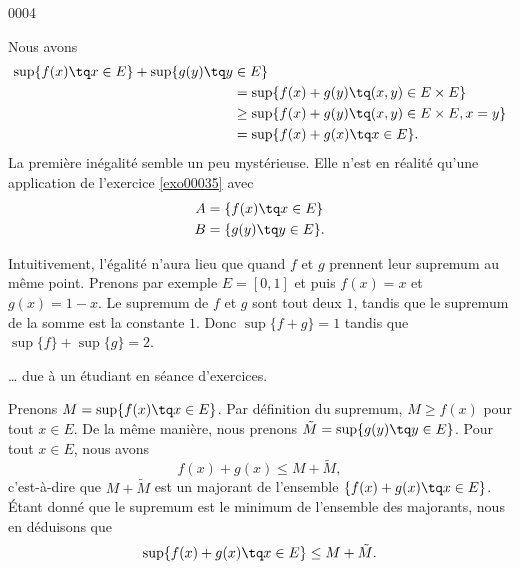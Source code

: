 
\begin{corrige}{0004}

Nous avons
\begin{equation}
	\begin{aligned}[]
		\sup\{ f(x)\tq x\in E \}+\sup\{ g(y)\tq y&\in E \}\\
							&=\sup\{ f(x)+g(y)\tq (x,y)\in E\times E \}\\
									&\geq\sup\{  f(x)+g(y)\tq (x,y)\in E\times E, x=y \} \\
							&=\sup\{ f(x)+g(x)\tq x\in E \}.
	\end{aligned}
\end{equation}
La première inégalité semble un peu mystérieuse. Elle n'est en réalité qu'une application de l'exercice \ref{exo00035} avec
\begin{equation}
	\begin{aligned}[]
		A&=\{ f(x)\tq x\in E \}\\
		B&=\{ g(y)\tq y\in E \}.
	\end{aligned}
\end{equation}

Intuitivement, l'égalité n'aura lieu que quand $f$ et $g$ prennent leur supremum au même point. Prenons par exemple $E=[0,1]$ et puis $f(x)=x$ et $g(x)=1-x$. Le supremum de $f$ et $g$ sont tout deux $1$, tandis que le supremum de la somme est la constante $1$. Donc $\sup\{ f+g \}=1$ tandis que $\sup\{ f \}+\sup\{ g \}=2$.

\vspace{0.5cm}

\ldots{} due à un étudiant en séance d'exercices.

Prenons $M=\sup\{ f(x)\tq x\in E \}$. Par définition du supremum, $M\geq f(x)$ pour tout $x\in E$. De la même manière, nous prenons $\tilde M=\sup\{ g(y)\tq y\in E \}$. Pour tout $x\in E$, nous avons
\begin{equation}
	f(x)+g(x)\leq M+\tilde M,
\end{equation}
c'est-à-dire que $M+\tilde M$ est un majorant de l'ensemble $\{ f(x)+g(x)\tq x\in E \}$. Étant donné que le supremum est le minimum de l'ensemble des majorants, nous en déduisons que
\begin{equation}
	\sup\{ f(x)+g(x)\tq x\in E \}\leq M+\tilde M.
\end{equation}

\end{corrige}
